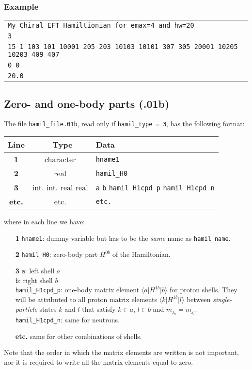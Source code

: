\documentclass[a4paper,11pt]{article}
\renewcommand{\tt}[1]{\texttt{#1}}
\newcommand{\bra}[1]{\langle #1 \vert}
\newcommand{\ket}[1]{\vert #1 \rangle}
\newcommand{\elma}[3]{\bra{#1} #2 \ket{#3}}
\begin{document}
\subsubsection*{Example}
\begin{center}
\begin{tabular}{|l|}
\hline
  \tt{My Chiral EFT Hamiltionian for emax=4 and hw=20} \\
  \tt{3} \\
  \tt{15      1    103    101  10001    205    203  10103  10101    307    305  20001  10205  10203    409    407} \\
  \tt{0  0} \\
  \tt{20.0} \\
\hline
\end{tabular}
\end{center}

\subsection{Zero- and one-body parts (.01b)}

The file \tt{hamil\_file.01b}, read only if \tt{hamil\_type = 3}, has the following format: 
\begin{center}
\begin{tabular}{|c|c|l|}
\hline
Line & \ Type \hfill & Data \\
\hline
\textbf{1}    & character         & \tt{hname1} \\
\textbf{2}    & real              & \tt{hamil\_H0} \\
\textbf{3}    & int. int. real real & \tt{a} \:\tt{b} \:\tt{hamil\_H1cpd\_p} \:\tt{hamil\_H1cpd\_n} \\
\textbf{etc.} &     etc.          &        \phantom{000000} \tt{etc.}  \\
\hline
\end{tabular}
\end{center}
where in each line we have:
\begin{itemize}
\item[\textbf{1}] \tt{hname1}: dummy variable but has to be the \emph{same} name as \tt{hamil\_name}.
\item[\textbf{2}] \tt{hamil\_H0}: zero-body part $H^{0b}$ of the Hamiltonian.
\item[\textbf{3}] \tt{a}: left shell $a$ \\
                  \tt{b}: right shell $b$ \\
                  \tt{hamil\_H1cpd\_p}: one-body matrix element $\elma{a}{H^{1b}}{b}$ for proton shells. 
                  They will be attributed to all proton matrix elements $\elma{k}{H^{1b}}{l}$
                  between \emph{single-particle} states $k$ and $l$ that satisfy $k \in a$, $l \in b$ and $m_{j_k} = m_{j_l}$. \\
                  \tt{hamil\_H1cpd\_n}: same for neutrons.
\item[\textbf{etc.}] same for other combinations of shells.
\end{itemize}
Note that the order in which the matrix elements are written is not important, nor it is required to write all the matrix elements equal to zero.
\end{document}
